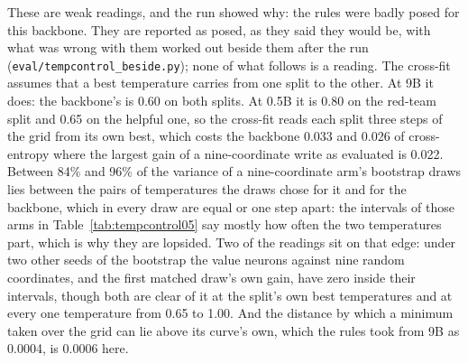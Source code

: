 \documentclass[11pt]{article}
\newcommand{\code}[1]{\texttt{#1}}
\begin{document}
These are weak readings, and the run showed why: the rules were badly posed for
this backbone. They are reported as posed, as they said they would be, with what
was wrong with them worked out beside them after the run
(\code{eval/\allowbreak{}tempcontrol\_\allowbreak{}beside.py}); none of what follows is a
reading. The cross-fit assumes that a best temperature carries from one split to
the other. At 9B it does: the backbone's is 0.60 on both splits. At 0.5B it is
0.80 on the red-team split and 0.65 on the helpful one, so the cross-fit reads
each split three steps of the grid from its own best, which costs the backbone
0.033 and 0.026 of cross-entropy where the largest gain of a nine-coordinate
write as evaluated is 0.022. Between 84\% and 96\% of the variance of a
nine-coordinate arm's bootstrap draws lies between the pairs of temperatures the
draws chose for it and for the backbone, which in every draw are equal or one
step apart: the intervals of those arms in Table~\ref{tab:tempcontrol05} say
mostly how often the two temperatures part, which is why they are lopsided. Two
of the readings sit on that edge: under two other seeds of the bootstrap the
value neurons against nine random coordinates, and the first matched draw's own
gain, have zero inside their intervals, though both are clear of it at the
split's own best temperatures and at every one temperature from 0.65 to 1.00. And
the distance by which a minimum taken over the grid can lie above its curve's
own, which the rules took from 9B as 0.0004, is 0.0006 here.
\end{document}
